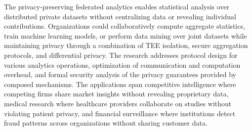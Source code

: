 The privacy-preserving federated analytics enables statistical analysis over distributed private datasets without centralizing data or revealing individual contributions. Organizations could collaboratively compute aggregate statistics, train machine learning models, or perform data mining over joint datasets while maintaining privacy through a combination of TEE isolation, secure aggregation protocols, and differential privacy. The research addresses protocol design for various analytics operations, optimization of communication and computation overhead, and formal security analysis of the privacy guarantees provided by composed mechanisms. The applications span competitive intelligence where competing firms share market insights without revealing proprietary data, medical research where healthcare providers collaborate on studies without violating patient privacy, and financial surveillance where institutions detect fraud patterns across organizations without sharing customer data.
